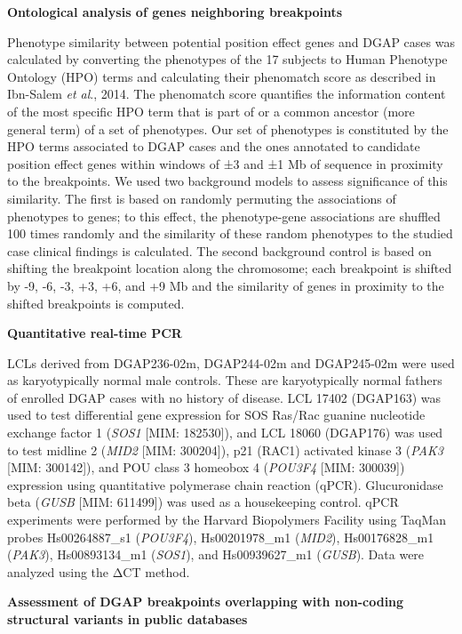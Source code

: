 \documentclass[a4paper,twoside=true,openright,parskip=full,chapterprefix=true,11pt,headings=normal,bibliography=totoc,listof=totoc,titlepage=on,captions=tableabove,draft=false]{scrreprt}
\theoremstyle{definition}
\theoremstyle{definition}
\theoremstyle{definition}
\theoremstyle{remark}
\begin{document}
\textbf{Ontological analysis of genes neighboring breakpoints}

Phenotype similarity between potential position effect genes and DGAP
cases was calculated by converting the phenotypes of the 17 subjects to
Human Phenotype Ontology (HPO)\citep{Kohler2014} terms and calculating
their phenomatch score as described in Ibn-Salem \emph{et al}.,
2014.\citep{Ibn-Salem2014} The phenomatch score quantiﬁes the
information content of the most speciﬁc HPO term that is part of or a
common ancestor (more general term) of a set of phenotypes. Our set of
phenotypes is constituted by the HPO terms associated to DGAP cases and
the ones annotated to candidate position effect genes within windows of
±3 and ±1 Mb of sequence in proximity to the breakpoints. We used two
background models to assess signiﬁcance of this similarity. The ﬁrst is
based on randomly permuting the associations of phenotypes to genes; to
this effect, the phenotype-gene associations are shuffled 100 times
randomly and the similarity of these random phenotypes to the studied
case clinical findings is calculated. The second background control is
based on shifting the breakpoint location along the chromosome; each
breakpoint is shifted by -9, -6, -3, +3, +6, and +9 Mb and the
similarity of genes in proximity to the shifted breakpoints is computed.

\textbf{Quantitative real-time PCR}

LCLs derived from DGAP236-02m, DGAP244-02m and DGAP245-02m were used as
karyotypically normal male controls. These are karyotypically normal
fathers of enrolled DGAP cases with no history of disease. LCL 17402
(DGAP163) was used to test differential gene expression for SOS Ras/Rac
guanine nucleotide exchange factor 1 (\emph{SOS1} {[}MIM: 182530{]}),
and LCL 18060 (DGAP176) was used to test midline 2 (\emph{MID2} {[}MIM:
300204{]}), p21 (RAC1) activated kinase 3 (\emph{PAK3} {[}MIM:
300142{]}), and POU class 3 homeobox 4 (\emph{POU3F4} {[}MIM: 300039{]})
expression using quantitative polymerase chain reaction (qPCR).
Glucuronidase beta (\emph{GUSB} {[}MIM: 611499{]}) was used as a
housekeeping control. qPCR experiments were performed by the Harvard
Biopolymers Facility using TaqMan probes Hs00264887\_s1 (\emph{POU3F4}),
Hs00201978\_m1 (\emph{MID2}), Hs00176828\_m1 (\emph{PAK3}),
Hs00893134\_m1 (\emph{SOS1}), and Hs00939627\_m1 (\emph{GUSB}). Data
were analyzed using the ΔCT method.

\textbf{Assessment of DGAP breakpoints overlapping with non-coding
structural variants in public databases}
\end{document}
